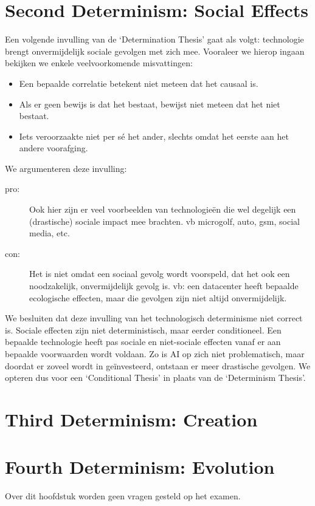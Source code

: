 \documentclass[../summary.tex]{subfiles}
\begin{document}
	\section{Second Determinism: Social Effects}
	Een volgende invulling van de `Determination Thesis' gaat als volgt: technologie brengt onvermijdelijk sociale gevolgen met zich mee. Vooraleer we hierop ingaan bekijken we enkele veelvoorkomende misvattingen:
	\begin{itemize}
		\item Een bepaalde correlatie betekent niet meteen dat het causaal is.
		\item Als er geen bewijs is dat het bestaat, bewijst niet meteen dat het niet bestaat.
		\item Iets veroorzaakte niet per sé het ander, slechts omdat het eerste aan het andere voorafging.
	\end{itemize}
	We argumenteren deze invulling:
	\begin{description}
		\item[pro:] Ook hier zijn er veel voorbeelden van technologieën die wel degelijk een (drastische) sociale impact mee brachten. vb microgolf, auto, gsm, social media, etc.
		\item[con:] Het is niet omdat een sociaal gevolg wordt voorspeld, dat het ook een noodzakelijk, onvermijdelijk gevolg is. vb: een datacenter heeft bepaalde ecologische effecten, maar die gevolgen zijn niet altijd onvermijdelijk. 
	\end{description}
	We besluiten dat deze invulling van het technologisch determinisme niet correct is. Sociale effecten zijn niet deterministisch, maar eerder conditioneel. Een bepaalde technologie heeft pas sociale en niet-sociale effecten vanaf er aan bepaalde voorwaarden wordt voldaan. Zo is AI op zich niet problematisch, maar doordat er zoveel wordt in geïnvesteerd, ontstaan er meer drastische gevolgen. We opteren dus voor een `Conditional Thesis' in plaats van de `Determinism Thesis'.
	
	\section{Third Determinism: Creation}
	
	\section{Fourth Determinism: Evolution}
	Over dit hoofdstuk worden geen vragen gesteld op het examen.
		
\end{document}
